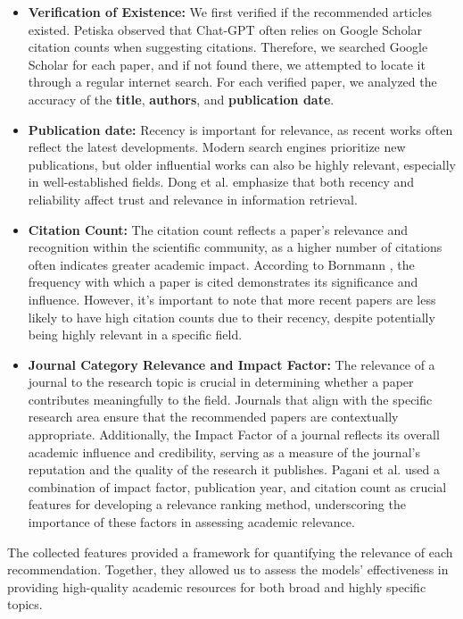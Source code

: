 \documentclass[runningheads]{llncs}
\begin{document}
\begin{itemize}
    \item \textbf{Verification of Existence:} We first verified if the recommended articles existed. Petiska \cite{petiska_2023} observed that Chat-GPT often relies on Google Scholar citation counts when suggesting citations. Therefore, we searched Google Scholar for each paper, and if not found there, we attempted to locate it through a regular internet search. For each verified paper, we analyzed the accuracy of the \textbf{title}, \textbf{authors}, and \textbf{publication date}.
    \item \textbf{Publication date:} Recency is important for relevance, as recent works often reflect the latest developments. Modern search engines prioritize new publications, but older influential works can also be highly relevant, especially in well-established fields. Dong et al. \cite{dong2010towards} emphasize that both recency and reliability affect trust and relevance in information retrieval.
    \item \textbf{Citation Count:} The citation count reflects a paper's relevance and recognition within the scientific community, as a higher number of citations often indicates greater academic impact. According to Bornmann \cite{bornmann2017measuring}, the frequency with which a paper is cited demonstrates its significance and influence. However, it's important to note that more recent papers are less likely to have high citation counts due to their recency, despite potentially being highly relevant in a specific field.
    \item \textbf{Journal Category Relevance and Impact Factor:} The relevance of a journal to the research topic is crucial in determining whether a paper contributes meaningfully to the field. Journals that align with the specific research area ensure that the recommended papers are contextually appropriate. Additionally, the Impact Factor of a journal reflects its overall academic influence and credibility, serving as a measure of the journal's reputation and the quality of the research it publishes. Pagani et al. \cite{pagani2015methodi} used a combination of impact factor, publication year, and citation count as crucial features for developing a relevance ranking method, underscoring the importance of these factors in assessing academic relevance.
\end{itemize}

The collected features provided a framework for quantifying the relevance of each recommendation. Together, they allowed us to assess the models' effectiveness in providing high-quality academic resources for both broad and highly specific topics.
\end{document}
